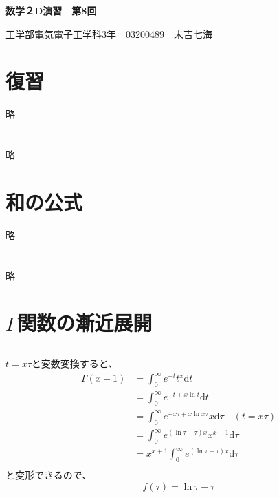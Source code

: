 \documentclass[dvipdfmx,a4paper]{jsarticle}
\begin{document}
\begin{center}
\textbf{\huge{数学２D演習　第8回}}
\end{center}

\begin{flushright}
工学部電気電子工学科3年　03200489　末吉七海\\
\end{flushright}

\section{復習}
略

\section{}
略

\section{和の公式}
略

\section{}
略

\section{$\Gamma$関数の漸近展開}
\subsection{}
$t = x\tau$と変数変換すると、
\begin{align*}
\Gamma(x + 1) &= \int_{0}^{\infty}e^{-t}t^{x}\mathrm{d}t\\
& = \int_{0}^{\infty}e^{-t + x\ln{t}}\mathrm{d}t\\
&=  \int_{0}^{\infty}e^{-x\tau + x\ln{x\tau}}x\mathrm{d}\tau\quad(t = x\tau)\\
&= \int_{0}^{\infty}e^{(\ln{\tau}-\tau)x} x^{x + 1}\mathrm{d}\tau\\
&=  x^{x + 1}\int_{0}^{\infty}e^{(\ln{\tau}-\tau)x}\mathrm{d}\tau\\
\end{align*}
と変形できるので、$$f(\tau) = \ln{\tau}-\tau$$\\

\end{document}
